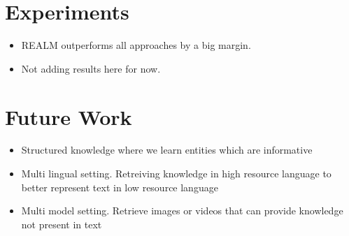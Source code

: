 \documentclass[a4paper]{article}
\begin{document}
\section{Experiments}
\begin{itemize}
    \item REALM outperforms all approaches by a big margin.
    \item Not adding results here for now.
\end{itemize}
\section{Future Work}
\begin{itemize}
    \item Structured knowledge where we learn entities which are informative
    \item Multi lingual setting. Retreiving knowledge in high resource language to better represent text in low resource language
    \item Multi model setting. Retrieve images or videos that can provide knowledge not present in text
\end{itemize}
\end{document}
